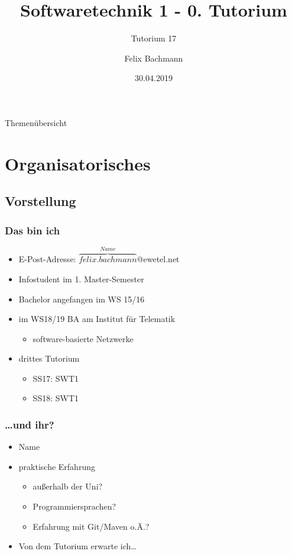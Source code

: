 \documentclass[18pt]{beamer}
\title[SWT1]{Softwaretechnik 1 - 0. Tutorium}
\subtitle{Tutorium 17}
\author{Felix Bachmann}
\date{30.04.2019}
\institute{KIT - Institut für Programmstrukturen und Datenorganisation (IPD)}
\begin{document}

\begin{frame}
\titlepage
\end{frame}

\begin{frame}{Themenübersicht}
\tableofcontents
\end{frame}

\section{Organisatorisches}
	\subsection{Vorstellung}
		\begin{frame}
			\frametitle{Das bin ich}
			\begin{itemize}
				\item E-Post-Adresse: $\overbrace{felix.bachmann}^{Name}$@ewetel.net 
				\item Infostudent im 1. Master-Semester
				\item Bachelor angefangen im WS 15/16
				\item im WS18/19 BA am Institut für Telematik
				\begin{itemize}
					\item software-basierte Netzwerke
				\end{itemize}
				\item drittes Tutorium
				\begin{itemize}
					\item SS17: SWT1
					\item SS18: SWT1
				\end{itemize}
			\end{itemize}
		\end{frame}
		\begin{frame}
			\frametitle{\dots und ihr?}
			\begin{itemize}
				\item Name
				\item praktische Erfahrung
				\begin{itemize}
					\item außerhalb der Uni?
					\item Programmiersprachen?
					\item Erfahrung mit Git/Maven o.Ä.?
				\end{itemize}
				\item Von dem Tutorium erwarte ich\dots
			\end{itemize}
		\end{frame}
	
\end{document}
